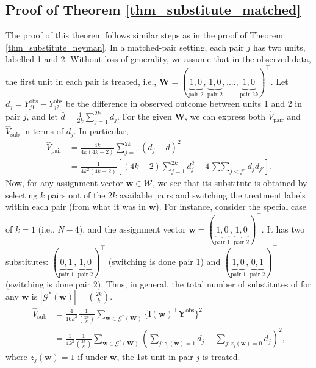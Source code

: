 \documentclass[12pt]{article}
\begin{document}
\subsection{Proof of Theorem \ref{thm_substitute_matched}}

The proof of this theorem follows similar steps as in the proof of Theorem \ref{thm_substitute_neyman}. In a matched-pair setting, each pair $j$ has two units, labelled 1 and 2. Without loss of generality, we assume that in the observed data, the first unit in each pair is treated, i.e., $\bm{W} = (\underbrace{1,0}_{\text{pair 2}},\underbrace{1,0}_{\text{pair 2}},....,\underbrace{1,0}_{\text{pair $2k$}})^\top$. Let $d_j = Y^{\text{obs}}_{j1} - Y^{\text{obs}}_{j2}$ be the difference in observed outcome between units 1 and 2 in pair $j$, and let $\bar{d} = \frac{1}{2k}\sum_{j=1}^{2k}d_{j}$. For the given $\bm{W}$, we can express both $\hat{V}_{\text{pair}}$ and $\hat{V}_{\text{sub}}$ in terms of $d_j$. In particular, 
\begin{align}
\hat{V}_{\text{pair}} &= \frac{4k}{4k(4k-2)}\sum_{j=1}^{2k}(d_j - \bar{d})^2 \nonumber \\
& = \frac{1}{4k^2(4k-2)}\left[(4k-2)\sum_{j=1}^{2k}d^2_j - 4\mathop{\sum\sum}_{j<j'}d_jd_{j'} \right]. \label{eq_pair1}
\end{align}
Now, for any assignment vector $\bm{w}\in \mathcal{W}$, we see that its substitute is obtained by selecting $k$ pairs out of the $2k$ available pairs and switching the treatment labels within each pair (from what it was in $\bm{w}$). For instance, consider the special case of $k=1$ (i.e., $N-4$), and the assignment vector $\bm{w} = (\underbrace{1,0}_{\text{pair 1}},\underbrace{1,0}_{\text{pair 2}})^\top$. It has two substitutes: $(\underbrace{0,1}_{\text{pair 1}},\underbrace{1,0}_{\text{pair 2}})^\top$ (switching is done pair 1) and $(\underbrace{1,0}_{\text{pair 1}},\underbrace{0,1}_{\text{pair 2}})^\top$ (switching is done pair 2). Thus, in general, the total number of substitutes of for any  $\bm{w}$ is $|\mathcal{G}^*(\bm{w})| = \binom{2k}{k}$. 
\begin{align}
    \hat{V}_{\text{sub}} & =  \frac{4}{16k^2}\frac{1}{\binom{2k}{k}}\sum_{\bm{w} \in \mathcal{G}^*(\bm{W})} \{\bm{l}(\bm{w})^\top \bm{Y}^{\text{obs}}\}^2 \nonumber\\
    & = \frac{1}{4k^2}\frac{1}{\binom{2k}{k}} \sum_{\bm{w} \in \mathcal{G}^*(\bm{W})} \left(\sum_{j:z_j(\bm{w}) = 1}d_j - \sum_{j:z_j(\bm{w}) = 0}d_j \right)^2,
\end{align}
where $z_j(\bm{w}) =1$ if under $\bm{w}$, the 1st unit in pair $j$ is treated. 
\end{document}
